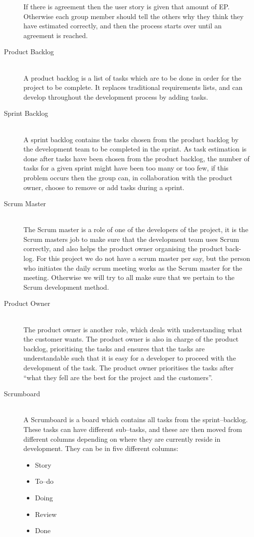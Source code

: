 \begin{description}
	If there is agreement then the user story is given that amount of EP.
	Otherwise each group member should tell the others why they think they have estimated correctly, and then the process starts over until an agreement is reached.
	\item[Product Backlog] \hfill \\
	A product backlog is a list of tasks which are to be done in order for the project to be complete.
	It replaces traditional requirements lists, and can develop throughout the development process by adding tasks.
	\item[Sprint Backlog] \hfill \\
	A sprint backlog contains the tasks chosen from the product backlog by the development team to be completed in the sprint.
	As task estimation is done after tasks have been chosen from the product backlog, the number of tasks for a given sprint might have been too many or too few, if this problem occurs then the group can, in collaboration with the product owner, choose to remove or add tasks during a sprint.
	\item[Scrum Master] \hfill \\
	The Scrum master is a role of one of the developers of the project, it is the Scrum masters job to make sure that the development team uses Scrum correctly, and also helps the product owner organising the product back-log.
	For this project we do not have a scrum master per say, but the person who initiates the daily scrum meeting works as the Scrum master for the meeting.
	Otherwise we will try to all make sure that we pertain to the Scrum development method.
	\item[Product Owner] \hfill \\
	The product owner is another role, which deals with understanding what the customer wants.
	The product owner is also in charge of the product backlog, prioritising the tasks and ensures that the tasks are understandable such that it is easy for a developer to proceed with the development of the task.
	The product owner prioritises the tasks after \enquote{what they fell are the best for the project and the customers}.
	\item[Scrumboard] \hfill \\
	A Scrumboard is a board which contains all tasks from the sprint--backlog.
	These tasks can have different sub--tasks, and these are then moved from different columns depending on where they are currently reside in development.
	They can be in five different columns:
	\begin{multicols}{5}
		\begin{itemize}
		\item Story
		\item To--do
		\item Doing
		\item Review
		\item Done
	\end{itemize}
	\end{multicols}


\end{description}
